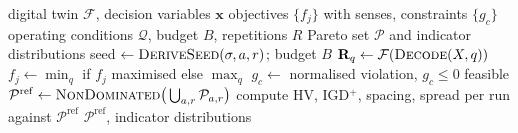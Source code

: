 \begin{algorithm}[!t]
\caption{Robust surrogate-driven multi-objective optimisation}
\label{alg:robust_surrogate_driven_multi_objective_optimisation}
\begin{algorithmic}[1]
\Require digital twin $\mathcal{F}$, decision variables $\mathbf{x}$
\Require objectives $\{f_j\}$ with senses, constraints $\{g_c\}$
\Require operating conditions $\mathcal{Q}$, budget $B$, repetitions $R$
\Ensure Pareto set $\mathcal{P}$ and indicator distributions
        \State seed $\leftarrow \textsc{DeriveSeed}(\sigma, a, r)$; budget $B$ 
                    \State $\mathbf{R}_q \leftarrow \mathcal{F}(\textsc{Decode}(X, q))$
                \EndFor
                \State $f_j \leftarrow \min_q$ if $f_j$ maximised else $\max_q$
                \State $g_c \leftarrow$ normalised violation, $g_c \le 0$ feasible
            \EndFor
        \EndWhile
    \EndFor
    \State $\mathcal{P}^{\mathrm{ref}} \leftarrow \textsc{NonDominated}\big(\bigcup_{a,r}\mathcal{P}_{a,r}\big)$
    \State compute HV, IGD$^+$, spacing, spread per run against $\mathcal{P}^{\mathrm{ref}}$
    \Return $\mathcal{P}^{\mathrm{ref}}$, indicator distributions
\end{algorithmic}
\end{algorithm}
